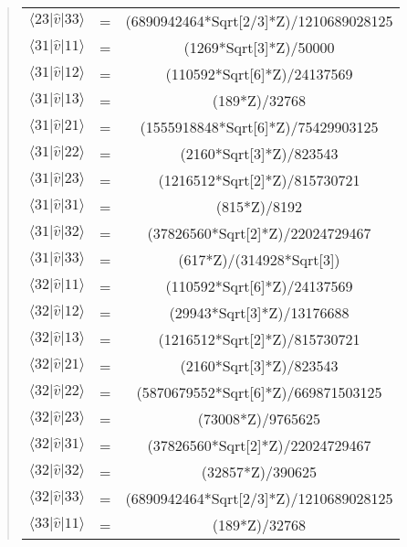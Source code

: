 \documentclass[%
oneside,                 %
final,                   %
10pt]{article}
\newenvironment{doconceexercise}{}{}
\begin{document}
\begin{doconceexercise}
\begin{quote}
\begin{tabular}{ccc}
$\langle 23\vert \hat{v} \vert 33\rangle$ & = & (6890942464*Sqrt[2/3]*Z)/1210689028125 \\
$\langle 31\vert \hat{v} \vert 11\rangle$ & = & (1269*Sqrt[3]*Z)/50000                 \\
$\langle 31\vert \hat{v} \vert 12\rangle$ & = & (110592*Sqrt[6]*Z)/24137569            \\
$\langle 31\vert \hat{v} \vert 13\rangle$ & = & (189*Z)/32768                          \\
$\langle 31\vert \hat{v} \vert 21\rangle$ & = & (1555918848*Sqrt[6]*Z)/75429903125     \\
$\langle 31\vert \hat{v} \vert 22\rangle$ & = & (2160*Sqrt[3]*Z)/823543                \\
$\langle 31\vert \hat{v} \vert 23\rangle$ & = & (1216512*Sqrt[2]*Z)/815730721          \\
$\langle 31\vert \hat{v} \vert 31\rangle$ & = & (815*Z)/8192                           \\
$\langle 31\vert \hat{v} \vert 32\rangle$ & = & (37826560*Sqrt[2]*Z)/22024729467       \\
$\langle 31\vert \hat{v} \vert 33\rangle$ & = & (617*Z)/(314928*Sqrt[3])               \\
$\langle 32\vert \hat{v} \vert 11\rangle$ & = & (110592*Sqrt[6]*Z)/24137569            \\
$\langle 32\vert \hat{v} \vert 12\rangle$ & = & (29943*Sqrt[3]*Z)/13176688             \\
$\langle 32\vert \hat{v} \vert 13\rangle$ & = & (1216512*Sqrt[2]*Z)/815730721          \\
$\langle 32\vert \hat{v} \vert 21\rangle$ & = & (2160*Sqrt[3]*Z)/823543                \\
$\langle 32\vert \hat{v} \vert 22\rangle$ & = & (5870679552*Sqrt[6]*Z)/669871503125    \\
$\langle 32\vert \hat{v} \vert 23\rangle$ & = & (73008*Z)/9765625                      \\
$\langle 32\vert \hat{v} \vert 31\rangle$ & = & (37826560*Sqrt[2]*Z)/22024729467       \\
$\langle 32\vert \hat{v} \vert 32\rangle$ & = & (32857*Z)/390625                       \\
$\langle 32\vert \hat{v} \vert 33\rangle$ & = & (6890942464*Sqrt[2/3]*Z)/1210689028125 \\
$\langle 33\vert \hat{v} \vert 11\rangle$ & = & (189*Z)/32768                          \\

\end{tabular}
\end{quote}
\end{doconceexercise}
\end{document}
